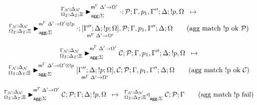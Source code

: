 
\begin{multline}
\transx{
   \matstatea{\deltan}{\cdot;
      \lstack{P}}{\Gamma, p_1, \Gamma''}{\Delta}{\bang p, \Omega}{\Delta' \rightarrow
         \Omega'}{\Sigma}
}
{
   \matstatea{\deltan}{\cdot; \pframe{\Gamma''}{\Delta}{\bang
   p}{\Omega}{\Delta'}{\Omega'}, \lstack{P}}{\Gamma, p_1, \Gamma''}{\Delta}{\Omega}
   {\Delta' \rightarrow \Omega' \otimes \bang p}{\Sigma}
} \tag{agg match \bang p ok $\lstack{P}$}
\end{multline}

\begin{multline}
\transx{
   \matstatea{\deltan}{\lstack{C};
      \lstack{P}}{\Gamma, p_1, \Gamma''}{\Delta}{\bang p, \Omega}{\Delta' \rightarrow
         \Omega'}{\Sigma}
}
{
   \matstatea{\deltan}{\pframe{\Gamma''}{\Delta}{\bang
   p}{\Omega}{\Delta'}{\Omega'}, \lstack{C} ; \lstack{P}}{\Gamma, p_1, \Gamma''}{\Delta}{\Omega}
   {\Delta' \rightarrow \Omega' \otimes \bang p}{\Sigma}
} \tag{agg match \bang p ok $\lstack{C}$}
\end{multline}

\[
\trans{
   \matstatea{\deltan}{\lstack{C}; \lstack{P}}{\Gamma}{\Delta}{\bang p,
      \Omega}{\Delta' \rightarrow \Omega'}{\Sigma}
}
{
   \contstatea{\deltan}{\lstack{C} ; \lstack{P}}{\Gamma}{\Sigma}
} \tag{agg match \bang p fail}
\]

